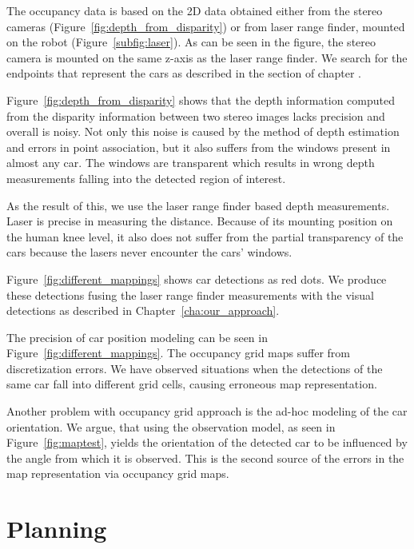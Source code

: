 The occupancy data is based on the 2D data obtained either from the stereo
cameras (Figure~\ref{fig:depth_from_disparity}) or from laser range finder,
mounted on the robot (Figure~\ref{subfig:laser}). As can be seen in the
figure, the stereo camera is mounted on the same z-axis as the laser range
finder. We search for the endpoints that represent the cars as described in
the section  of chapter .

Figure~\ref{fig:depth_from_disparity} shows that the depth information
computed from the disparity information between two stereo images lacks
precision and overall is noisy. Not only this noise is caused by the method of
depth estimation and errors in point association, but it also suffers from the
windows present in almost any car. The windows are transparent which results
in wrong depth measurements falling into the detected region of interest.

As the result of this, we use the laser range finder based depth measurements.
Laser is precise in measuring the distance. Because of its mounting position
on the human knee level, it also does not suffer from the partial transparency
of the cars because the lasers never encounter the cars' windows.

Figure~\ref{fig:different_mappings} shows car detections as red dots. We
produce these detections fusing the laser range finder measurements with the
visual detections as described in Chapter~\ref{cha:our_approach}.

The precision of car position modeling can be seen in
Figure~\ref{fig:different_mappings}. The occupancy grid maps suffer from
discretization errors. We have observed situations when the detections of the
same car fall into different grid cells, causing erroneous map representation.

Another problem with occupancy grid approach is the ad-hoc modeling of the car
orientation. We argue, that using the observation model, as seen in
Figure~\ref{fig:maptest}, yields the orientation of the detected car to be
influenced by the angle from which it is observed. This is the second source
of the errors in the map representation via occupancy grid maps.



\section{Planning}
\label{sec:planning_results}

